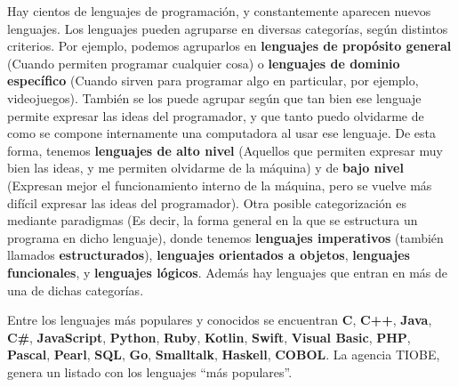 Hay cientos de lenguajes de programación, y constantemente aparecen nuevos
lenguajes. Los lenguajes pueden agruparse en diversas categorías, según
distintos criterios. Por ejemplo, podemos agruparlos en \textbf{lenguajes de
propósito general} (Cuando permiten programar cualquier cosa) o
\textbf{lenguajes de dominio específico} (Cuando sirven para programar algo en
particular, por ejemplo, videojuegos). También se los puede agrupar según que
tan bien ese lenguaje permite expresar las ideas del programador, y que tanto
puedo olvidarme de como se compone internamente una computadora al usar ese
lenguaje. De esta forma, tenemos \textbf{lenguajes de alto nivel} (Aquellos que
permiten expresar muy bien las ideas, y me permiten olvidarme de la máquina) y
de \textbf{bajo nivel} (Expresan mejor el funcionamiento interno de la máquina,
pero se vuelve más difícil expresar las ideas del programador). Otra posible
categorización es mediante paradigmas (Es decir, la forma general en la que se
estructura un programa en dicho lenguaje), donde tenemos \textbf{lenguajes
imperativos} (también llamados \textbf{estructurados}), \textbf{lenguajes
orientados a objetos}, \textbf{lenguajes funcionales}, y \textbf{lenguajes
lógicos}. Además hay lenguajes que entran en más de una de dichas categorías.

Entre los lenguajes más populares y conocidos se encuentran \textbf{C},
\textbf{C++}, \textbf{Java}, \textbf{C\#}, \textbf{JavaScript}, \textbf{Python},
\textbf{Ruby}, \textbf{Kotlin}, \textbf{Swift}, \textbf{Visual Basic},
\textbf{PHP}, \textbf{Pascal}, \textbf{Pearl}, \textbf{SQL}, \textbf{Go},
\textbf{Smalltalk}, \textbf{Haskell}, \textbf{COBOL}. La agencia TIOBE, genera
un listado con los lenguajes ``más populares''.


